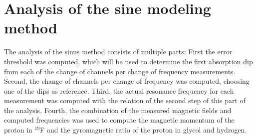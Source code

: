 \section{Analysis of the sine modeling  method}
The analysis of the sinus method consists of multiple parts: First the error threshold was computed, which will be used to determine the first absorption dip from each of the change of channels per change of frequency measurements.
Second, the change of channels per change of frequency was computed, choosing one of the dips as reference. 
Third, the actual resonance frequency for each measurement was computed with the relation of the second step of this part of the analysis.
Fourth, the combination of the measured magnetic fields and computed frequencies was used to compute the magnetic momentum of the proton in $^{19}$F and the gyromagnetic ratio of the proton in glycol and hydrogen.
